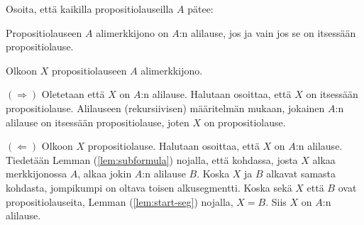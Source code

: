\documentclass[12pt,a4paper]{article}
\begin{document}
\begin{exercise}[Haastetehtävä]
Osoita, että kaikilla propositiolauseilla \(A\) pätee:

Propositiolauseen \(A\) alimerkkijono on \(A\):n alilause, jos ja vain jos
se on itsessään propositiolause.
\end{exercise}

\begin{solution}
Olkoon \(X\) propositiolauseen \(A\) alimerkkijono.

\((\Longrightarrow)\) Oletetaan että \(X\) on \(A\):n alilause.
Halutaan osoittaa, että \(X\) on itsessään propositiolause.
Alilauseen (rekursiivisen) määritelmän mukaan, jokainen \(A\):n alilause on
itsessään propositiolause, joten \(X\) on propositiolause.

\((\Longleftarrow)\) Olkoon \(X\) propositiolause. Halutaan osoittaa,
että \(X\) on \(A\):n alilause. Tiedetään Lemman (\ref{lem:subformula}) nojalla,
että kohdassa, josta \(X\) alkaa merkkijonossa \(A\), alkaa jokin \(A\):n
alilause \(B\). Koska \(X\) ja \(B\) alkavat samasta kohdasta,
jompikumpi on oltava toisen alkusegmentti. Koska sekä \(X\) että \(B\) ovat
propositiolauseita, Lemman (\ref{lem:start-seg}) nojalla, \(X = B\).
Siis \(X\) on \(A\):n alilause.
\end{solution}
\end{document}
